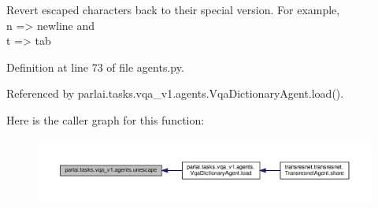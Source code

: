 \begin{DoxyVerb}Revert escaped characters back to their special version.
For example, \\n => newline and \\t => tab
\end{DoxyVerb}
 

Definition at line 73 of file agents.\+py.



Referenced by parlai.\+tasks.\+vqa\+\_\+v1.\+agents.\+Vqa\+Dictionary\+Agent.\+load().

Here is the caller graph for this function\+:
\nopagebreak
\begin{figure}[H]
\begin{center}
\leavevmode
\includegraphics[width=350pt]{namespaceparlai_1_1tasks_1_1vqa__v1_1_1agents_ab44e9835e0cedea3719e3baebfe0e94b_icgraph}
\end{center}
\end{figure}
